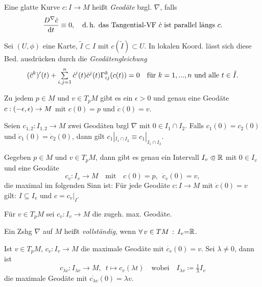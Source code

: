 \documentclass{cheat-sheet}
\newcommand{\vinterval}{\ointerval{-\epsilon}{\epsilon}} %
\begin{document}

\begin{defn}
  Eine glatte Kurve $c : I \to M$ heißt \emph{Geodäte} bzgl. $\nabla$, falls
  \[
    \frac{D^\nabla \dot{c}}{\mathrm{d} t} \equiv 0, \quad
    \text{d.\,h.{} das Tangential-VF $\dot{c}$ ist parallel längs $c$.}
  \]
\end{defn}

\begin{bem}
  Sei $(U, \phi)$ eine Karte, $\tilde{I} \subset I$ mit $c(\tilde{I}) \subset U$.
  In lokalen Koord. lässt sich diese Bed. ausdrücken durch die \emph{Geodätengleichung}
  \[
    (\ddot{c}^{k})'(t) + \sum_{i,j=1}^n \dot{c}^i(t) \dot{c}^j(t) \Gamma_{ij}^k(c(t)) = 0
    \quad \text{für $k = 1, \nldots, n$ und alle $t \in \tilde{I}$.}
  \]
\end{bem}

\begin{satz}
  Zu jedem $p \in M$ und $v \in T_p M$ gibt es ein $\epsilon > 0$ und genau eine Geodäte $c : \vinterval \to M$ mit $c(0) = p$ und $\dot{c}(0) = v$.
\end{satz}

\begin{satz}
  Seien $c_{1,2} : I_{1,2} \to M$ zwei Geodäten bzgl $\nabla$ mit $0 \in I_1 \cap I_2$. Falls $c_1(0) = c_2(0)$ und $\dot{c}_1(0) = \dot{c}_2(0)$, dann gilt $c_1|_{I_1 \cap I_2} \equiv c_1|_{I_1 \cap I_2}$.
\end{satz}

\begin{satz}
  Gegeben $p \in M$ und $v \in T_p M$, dann gibt es genau ein Intervall $I_v \opn \R$ mit $0 \in I_v$ und eine Geodäte
  \[
    c_v : I_v \to M
    \quad \text{mit} \quad
    c(0) = p, \enspace \dot{c}_v(0) = v,
  \]
  die maximal im folgenden Sinn ist: Für jede Geodäte $c : I \to M$ mit $\dot{c}(0) = v$ gilt: $I \subseteq I_v$ und $c = c_v|_I$.
\end{satz}

\begin{nota}
  Für $v \in T_p M$ sei $c_v : I_v \to M$ die zugeh. max. Geodäte.
\end{nota}

\begin{defn}
  Ein Zshg $\nabla$ auf $M$ heißt \emph{vollständig}, wenn $\forall \, {v \in TM} \,:\, I_v {=} \mathbb{R}$.
\end{defn}


\begin{lem}
  Ist $v \in T_p M$, $c_v : I_v \to M$ die maximale Geodäte mit $\dot{c_v}(0) = v$.
  Sei $\lambda \not= 0$, dann ist
  \[
    c_{\lambda v} : I_{\lambda v} \to M, \enspace
    t \mapsto c_v(\lambda t) \quad \text{wobei} \quad
    I_{\lambda v} \coloneqq \tfrac{1}{\lambda} I_v
  \]
  die maximale Geodäte mit $\dot{c_{\lambda v}}(0) = \lambda v$.
\end{lem}
\end{document}
